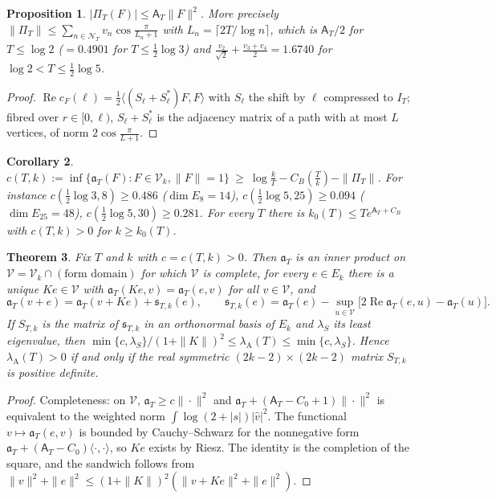 \documentclass[11pt]{amsart}
\newtheorem{theorem}{Theorem}[section]
\newtheorem{proposition}[theorem]{Proposition}
\newtheorem{corollary}[theorem]{Corollary}
\theoremstyle{definition}
\theoremstyle{remark}
\newcommand{\Rel}{\operatorname{Re}}
\newcommand{\IT}{I_T}
\newcommand{\cF}{c_F}
\newcommand{\NT}{\mathcal N_T}
\newcommand{\Aconst}{\mathsf A_T}
\newcommand{\PiT}{\Pi_T}
\newcommand{\lamA}{\lambda_{\mathrm A}}
\begin{document}
\begin{proposition}\label{prop:prime}
$|\PiT(F)|\le\Aconst\|F\|^2$. More precisely $\|\PiT\|\le\sum_{n\in\NT}v_n\cos\frac\pi{L_n+1}$ with $L_n=\lceil2T/\log n\rceil$,
which is $\Aconst/2$ for $T\le\log2$ ($=0.4901$ for $T\le\frac12\log3$) and $\frac{v_2}{\sqrt2}+\frac{v_3+v_4}2=1.6740$ for
$\log2<T\le\frac12\log5$.
\end{proposition}
\begin{proof}
$\Rel\cF(\ell)=\frac12\langle(S_\ell+S_\ell^*)F,F\rangle$ with $S_\ell$ the shift by $\ell$ compressed to $\IT$; fibred over
$r\in[0,\ell)$, $S_\ell+S_\ell^*$ is the adjacency matrix of a path with at most $L$ vertices, of norm $2\cos\frac\pi{L+1}$.
\end{proof}

\begin{corollary}\label{cor:L1}
$c(T,k):=\inf\{\mathfrak a_T(F):F\in\mathcal V_k,\|F\|=1\}\ \ge\ \log\frac kT-C_B(\frac Tk)-\|\PiT\|$. For instance
$c(\frac12\log3,8)\ge0.486$ ($\dim E_8=14$), $c(\frac12\log5,25)\ge0.094$ ($\dim E_{25}=48$), $c(\frac12\log5,30)\ge0.281$.
For every $T$ there is $k_0(T)\le Te^{\Aconst+C_B}$ with $c(T,k)>0$ for $k\ge k_0(T)$.
\end{corollary}

\begin{theorem}\label{thm:schur}
Fix $T$ and $k$ with $c=c(T,k)>0$. Then $\mathfrak a_T$ is an inner product on $\mathcal V=\mathcal V_k\cap(\text{form domain})$
for which $\mathcal V$ is complete, for every $e\in E_k$ there is a unique $Ke\in\mathcal V$ with
$\mathfrak a_T(Ke,v)=\mathfrak a_T(e,v)$ for all $v\in\mathcal V$, and
\[
\mathfrak a_T(v+e)=\mathfrak a_T(v+Ke)+\mathfrak s_{T,k}(e),\qquad
\mathfrak s_{T,k}(e)=\mathfrak a_T(e)-\sup_{u\in\mathcal V}\big[2\Rel\mathfrak a_T(e,u)-\mathfrak a_T(u)\big].
\]
If $S_{T,k}$ is the matrix of $\mathfrak s_{T,k}$ in an orthonormal basis of $E_k$ and $\lambda_S$ its least eigenvalue, then
$\min\{c,\lambda_S\}/(1+\|K\|)^2\le\lamA(T)\le\min\{c,\lambda_S\}$. Hence $\lamA(T)>0$ if and only if the real symmetric
$(2k-2)\times(2k-2)$ matrix $S_{T,k}$ is positive definite.
\end{theorem}
\begin{proof}
Completeness: on $\mathcal V$, $\mathfrak a_T\ge c\|\cdot\|^2$ and $\mathfrak a_T+(\Aconst-C_0+1)\|\cdot\|^2$ is equivalent to the
weighted norm $\int\log(2+|s|)|\widehat v|^2$. The functional $v\mapsto\mathfrak a_T(e,v)$ is bounded by Cauchy--Schwarz for the
nonnegative form $\mathfrak a_T+(\Aconst-C_0)\langle\cdot,\cdot\rangle$, so $Ke$ exists by Riesz. The identity is the completion of
the square, and the sandwich follows from $\|v\|^2+\|e\|^2\le(1+\|K\|)^2(\|v+Ke\|^2+\|e\|^2)$.
\end{proof}
\end{document}
